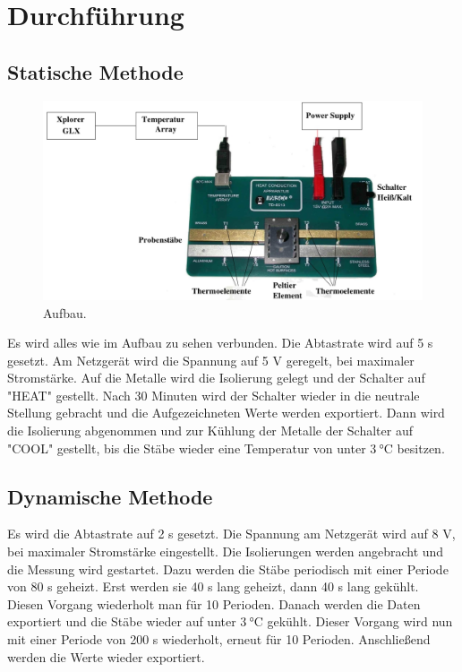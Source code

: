 \section{Durchführung}
\subsection{Statische Methode}
\label{sec:Durchführung}
\begin{figure}
  \centering
  \includegraphics{data/abb1.jpg}
  \caption{Aufbau. \cite{V204}}
  \label{fig:Abb1}
\end{figure}
Es wird alles wie im Aufbau zu sehen verbunden.
Die Abtastrate wird auf 5 s gesetzt.
Am Netzgerät wird die Spannung auf 5 V geregelt, bei maximaler Stromstärke.
Auf die Metalle wird die Isolierung gelegt und der Schalter auf "HEAT" gestellt.
Nach 30 Minuten wird der Schalter wieder in die neutrale Stellung gebracht und die Aufgezeichneten Werte werden exportiert.
Dann wird die Isolierung abgenommen und zur Kühlung der Metalle der Schalter auf "COOL" gestellt, bis die Stäbe wieder eine Temperatur von unter $\SI{3}{\celsius}$ besitzen.

\subsection{Dynamische Methode}
Es wird die Abtastrate auf 2 s gesetzt.
Die Spannung am Netzgerät wird auf 8 V, bei maximaler Stromstärke eingestellt.
Die Isolierungen werden angebracht und die Messung wird gestartet.
Dazu werden die Stäbe periodisch mit einer Periode von 80 s geheizt.
Erst werden sie 40 s lang geheizt, dann 40 s lang gekühlt.
Diesen Vorgang wiederholt man für 10 Perioden.
Danach werden die Daten exportiert und die Stäbe wieder auf unter $\SI{3}{\celsius}$ gekühlt.
Dieser Vorgang wird nun mit einer Periode von 200 s wiederholt, erneut für 10 Perioden.
Anschließend werden die Werte wieder exportiert.